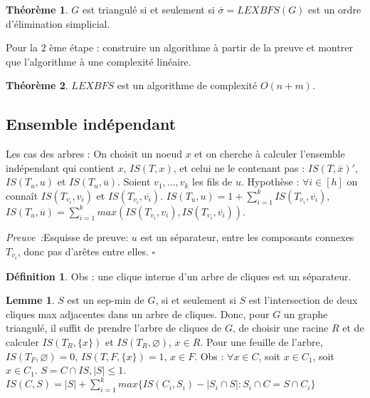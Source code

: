 \documentclass{book}
\theoremstyle{definition}
\newtheorem{lemma}{Lemme}
\newtheorem{theorem}{Théorème}
\newtheorem{definition}{Définition}
\numberwithin{lemma}{subsection}
\numberwithin{theorem}{subsection}
\numberwithin{definition}{subsection}
\numberwithin{proposition}{subsection}
\numberwithin{corollary}{subsection}
\numberwithin{property}{subsection}
\numberwithin{example}{subsection}
\numberwithin{heuristique}{subsection}
\numberwithin{scenario}{subsection}
\newenvironment{proofi} {\noindent\emph{Preuve~:}} {\hfill $\square$\vspace{0.2cm}}
\begin{document}

\begin{theorem}
 $G$ est triangulé si et seulement si $\overline{\sigma} = LEXBFS(G)$ est un ordre d'élimination simplicial.
\end{theorem}

Pour la 2 ème étape : construire un algorithme à partir de la preuve et montrer que l'algorithme à une complexité linéaire.

\begin{theorem}
 $LEXBFS$ est un algorithme de complexité $O(n+m)$.
\end{theorem}

\subsection{Ensemble indépendant}

Les cas des arbres : 
On choisit un noeud $x$ et on cherche à calculer l'ensemble indépendant qui contient $x$, $IS(T, x)$, et celui ne le contenant pas : $IS(T, \overline{x})'$, $IS(T_u, u)$ et $IS(T_u, \overline{u})$. Soient $v_1, ..., v_k$ les fils de $u$. Hypothèse : $\forall i \in [h]$ on connaît $IS(T_{v_i}, v_i)$ et $IS(T_{v_i}, \overline{v_i})$. $IS(T_u, u) = 1 + \sum_{i=1}^k IS(T_{v_i}, \overline{v_i})$, $IS(T_u, \overline{u}) = \sum_{i=1}^k max(IS(T_{v_i}, v_i), IS(T_{v_i}, \overline{v_i}))$.

\begin{proofi}{Esquisse de preuve:}
$u$ est un séparateur, entre les composants connexes $T_{v_i}$, donc pas d'arêtes entre elles.
\end{proofi}

\begin{definition}
Obs : une clique interne d'un arbre de cliques est un séparateur.
\end{definition}

\begin{lemma}
$S$ est un sep-min de $G$, si et seulement si $S$ est l'intersection de deux cliques max adjacentes dans un arbre de cliques. Donc, pour $G$ un graphe triangulé, il suffit de prendre l'arbre de cliques de $G$, de choisir une racine $R$ et de calculer $IS(T_R, \{x\})$ et $IS(T_R, \varnothing)$, $x \in R$. Pour une feuille de l'arbre, $IS(T_F, \varnothing) = 0$, $IS(T, F, \{ x \}) = 1$, $x \in F$.  
Obs : $\forall x \in C$, soit $x \in C_1$, soit $x \in C_1$.
$S = C \cap IS, |S| \leq 1$. $IS(C, S) = |S| + \sum_{i=1}^k max \{IS(C_i, S_i) - |S_i \cap S| : S_i \cap C = S \cap C_i \}$
\end{lemma}
\end{document}
